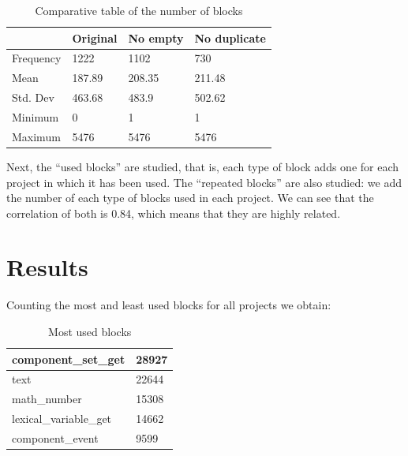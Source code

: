\documentclass[a4paper]{article}
\begin{document}


\begin{table}[ht]
\begin{center}
\caption{Comparative table of the number of blocks}

\bigskip

\begin{tabular}{|l|l|l|l|}
\hline
& Original & No empty & No duplicate \\ \hline
Frequency & 1222 & 1102 & 730\\ \hline
Mean & 187.89 & 208.35 & 211.48\\ \hline
Std. Dev & 463.68 & 483.9 & 502.62 \\ \hline
Minimum & 0 & 1 & 1\\ \hline
Maximum & 5476 & 5476 & 5476 \\ \hline
\end{tabular}
\end{center}
\end{table}

Next, the ``used blocks'' are studied, that is, each type of block adds one for each project in which it has been used. The ``repeated blocks'' are also studied: we add the number of each type of blocks used in each project. We can see that the correlation of both is 0.84, which means that they are highly related.

\section{Results}

Counting the most and least used blocks for all projects we obtain:

\begin{table}[ht]
\begin{center}
\caption{Most used blocks}

\bigskip

\begin{tabular}{|l|l|}
\hline
component\_set\_get & 28927\\ \hline
text & 22644\\ \hline
math\_number & 15308\\ \hline
lexical\_variable\_get & 14662\\ \hline
component\_event & 9599\\ \hline
\end{tabular}
\end{center}
\end{table}
\end{document}
